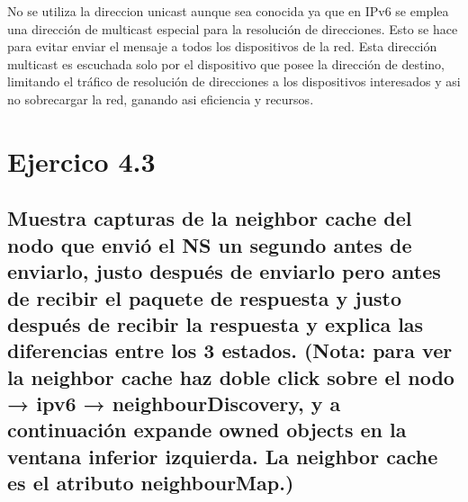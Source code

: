 No se utiliza la direccion unicast aunque sea conocida ya que en IPv6 se emplea una dirección de multicast especial para la resolución de direcciones. Esto se hace para evitar enviar el mensaje a todos los dispositivos de la red. Esta dirección multicast es escuchada solo por el dispositivo que posee la dirección de destino, limitando el tráfico de resolución de direcciones a los dispositivos interesados y asi no sobrecargar la red, ganando asi eficiencia y recursos.


\section{Ejercico 4.3}
\subsection{Muestra capturas de la neighbor cache del nodo que envió el NS un segundo antes de enviarlo, justo después de enviarlo pero antes de recibir el paquete de respuesta y justo después de recibir la respuesta y explica las diferencias entre los 3 estados. (Nota: para ver la neighbor cache haz doble click sobre el nodo → ipv6 → neighbourDiscovery, y a continuación expande owned objects en la ventana inferior izquierda. La neighbor cache es el atributo neighbourMap.)}


